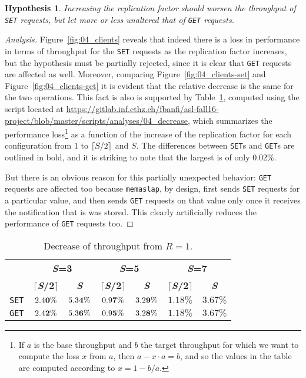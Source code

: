 \documentclass[11pt]{article}
\DeclarePairedDelimiter{\ceil}{\lceil}{\rceil}
\newtheorem{hyp}{Hypothesis}
\theoremstyle{definition}
\newenvironment{ana}[1][\proofname]{\begin{proof}[Analysis]}{\end{proof}}
\renewcommand\b[1]{{\bf{#1}}}
\renewcommand\t\texttt
\begin{document}
\begin{hyp}
    Increasing the replication factor should worsen the throughput of \t{SET} requests, but let more or less unaltered that of \t{GET} requests.
\end{hyp}
\begin{ana}
    Figure~\ref{fig:04_clients} reveals that indeed there is a loss in performance in terms of throughput for the \t{SET} requests as the replication factor increases, but the hypothesis must be partially rejected, since it is clear that \t{GET} requests are affected as well.
    Moreover, %
    comparing Figure~\ref{fig:04_clients-set} and Figure~\ref{fig:04_clients-get} it is evident that the relative decrease is the same for the two operations. %
    This fact is also is supported by Table~\ref{tab:ex2ratios}, computed using the script located at \url{https://gitlab.inf.ethz.ch/fbanfi/asl-fall16-project/blob/master/scripts/analyses/04_decrease}, which summarizes the performance loss\footnote{If $a$ is the base throughput and $b$ the target throughput for which we want to compute the loss $x$ from $a$, then $a-x\cdot a=b$, and so the values in the table are computed according to $x=1-b/a$.} as a function of the increase of the replication factor for each configuration from $1$ to $\ceil{S/2}$ and $S$.
    The differences between \t{SET}s and \t{GET}s are outlined in bold, and it is striking to note that the largest is of only $0.02\%$.
    
    But there is an obvious reason for this partially unexpected behavior: \t{GET} requests are affected too because \t{memaslap}, by design, first sends \t{SET} requests for a particular value, and then sends \t{GET} requests on that value only once it receives the notification that is was stored.
    This clearly artificially reduces the performance of \t{GET} requests too.
\end{ana}

\begin{table}[h]
    \centering
    \small
    {
        \begin{tabular}{|c||c|c||c|c||c|c|}
            \cline{2-7}
            \multicolumn{1}{c|}{} & \multicolumn{2}{c||}{\b{\textit S=3}} & \multicolumn{2}{c||}{\b{\textit S=5}} & \multicolumn{2}{c|}{\b{\textit S=7}} \\ 
            \cline{2-7}
            \multicolumn{1}{c|}{} & $\lceil$\b{\textit S/2}$\rceil$ & {\b{\textit S}} & $\lceil$\b{\textit S/2}$\rceil$ & {\b{\textit S}} & $\lceil$\b{\textit S/2}$\rceil$ & {\b{\textit S}} \\
            \hline
            \hline
            \t{SET} & $2.4\b0\%$ & $5.3\b4\%$ & $0.9\b7\%$ & $3.2\b9\%$ & $1.18\%$ & $3.67\%$ \\
            \hline
            \t{GET} & $2.4\b2\%$ & $5.3\b6\%$ & $0.9\b5\%$ & $3.2\b8\%$ & $1.18\%$ & $3.67\%$ \\
            \hline
        \end{tabular}
    }
    \caption{Decrease of throughput from $R=1$.}
    \label{tab:ex2ratios}
\end{table}
\end{document}
